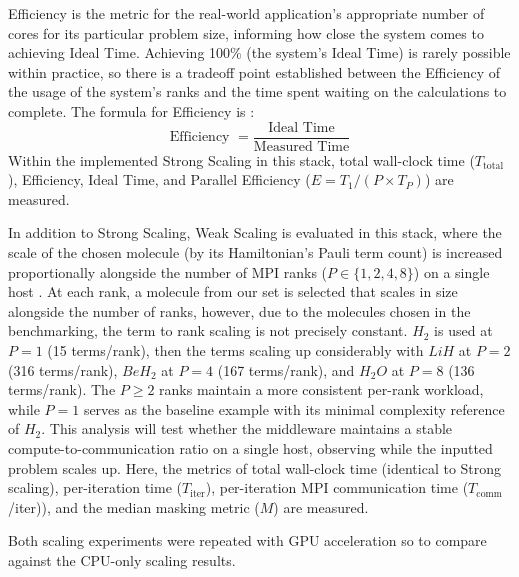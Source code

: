 Efficiency is the metric for the real-world application's appropriate number of cores for its particular problem size, informing how close the system comes to achieving Ideal Time. Achieving 100\% (the system's Ideal Time) is 
rarely possible within practice, so there is a tradeoff point established between the Efficiency of the usage of the system's ranks
and the time spent waiting on the calculations to complete. The formula for Efficiency is \parencite{cuboulderScaling}: 
\begin{equation}
    \text {Efficiency } = \frac{\text{Ideal Time}}{\text{Measured Time}}
\end{equation}
Within the implemented Strong Scaling in this stack, total wall-clock time ($T_{\text{total}}$), Efficiency, Ideal Time, and Parallel Efficiency ($E= T_1 / (P \times T_P)$) are measured. 

In addition to Strong Scaling, Weak Scaling is evaluated in this stack, where the scale of the chosen molecule (by its Hamiltonian's Pauli term count) is 
increased proportionally alongside the number of MPI ranks ($P \in \{1,2,4,8\}$) on a single host \parencite{gustafson1988reevaluating}. At each rank, a molecule from our set is selected that scales in size alongside the number of ranks, however, due to the molecules chosen in the benchmarking, 
the term to rank scaling is not precisely constant.  $H_{2}$ is used at $P=1$ (15 terms/rank), then the terms scaling up considerably with $LiH$ at $P=2$ (316 terms/rank), $BeH_{2}$ at $P=4$ (167 terms/rank), 
and $H_{2}O$ at $P=8$ (136 terms/rank). The $P \geq 2$ ranks maintain a more consistent per-rank workload, while $P=1$ serves as the baseline example with its minimal complexity reference of $H_2$.  
This analysis will test whether the middleware maintains a stable compute-to-communication ratio on a single host, observing while the inputted problem scales up. 
Here, the metrics of total wall-clock time (identical to Strong scaling), per-iteration time ($T_{\text{iter}}$), per-iteration MPI communication time ($T_{\text{comm}}$/iter)), and the median masking metric ($M$) are measured. 

Both scaling experiments were repeated with GPU acceleration so to compare against the CPU-only scaling results. 

